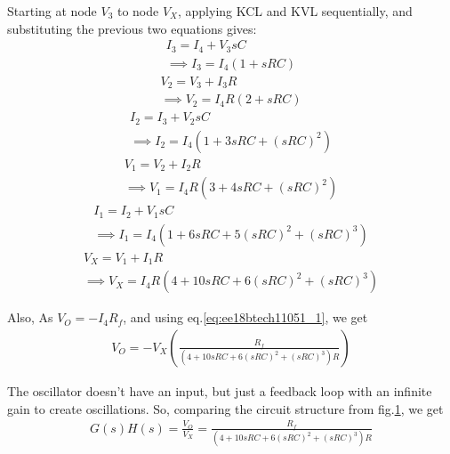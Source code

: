 \begin{enumerate}[label=\arabic*.,ref=\theenumi]
Starting at node $V_{3}$ to node $V_{X}$, applying KCL and KVL sequentially, and substituting the previous two equations gives:
\begin{multline}
    I_{3} = I_{4} + V_{3}sC  \\  \implies I_{3} = I_{4}(1+sRC) 
\end{multline}
\begin{multline}
    V_{2} = V_{3} + I_{3}R  \\  \implies V_{2} = I_{4}R(2+sRC)
\end{multline}
\begin{multline}
    I_{2} = I_{3} + V_{2}sC\\
    \implies I_{2} = I_{4}(1+3sRC+(sRC)^{2}) 
\end{multline}
\begin{multline}
    V_{1} = V_{2}+ I_{2}R\\
    \implies V_{1} = I_{4}R(3+4sRC+(sRC)^{2})
\end{multline}
\begin{multline}
    I_{1} = I_{2} + V_{1}sC\\
    \implies I_{1} = I_{4}(1+6sRC+5(sRC)^2+(sRC)^3)
\end{multline}
\begin{multline}
    V_{X} = V_{1} + I_{1}R\\
    \implies V_{X} = I_{4}R(4+10sRC+6(sRC)^2+(sRC)^3)
    \label{eq:ee18btech11051_1}
\end{multline}

\begin{figure}[!ht]
	\begin{center}
		\resizebox{\columnwidth}{!}{}
	\end{center}
\caption{}
\label{fig:ee18btech11051_fig3}
\end{figure}
Also, As $V_{O} = -I_{4}R_{f}$, and using eq.\ref{eq:ee18btech11051_1}, we get
\begin{align}
    V_{O} = -V_{X}(\frac{R_{f}}{(4+10sRC+6(sRC)^2+(sRC)^3)R})
\end{align}

The oscillator doesn't have an input, but just a feedback loop with an infinite gain to create oscillations. So, comparing the circuit structure from fig.\ref{fig:ee18btech11051_fig3}, we get
\begin{align}
    G(s)H(s) = \frac{V_{O}}{V_{X}} = \frac{R_{f}}{(4+10sRC+6(sRC)^2+(sRC)^3)R}
    \label{eq:ee18btech11051_2}
\end{align}


\end{enumerate}
